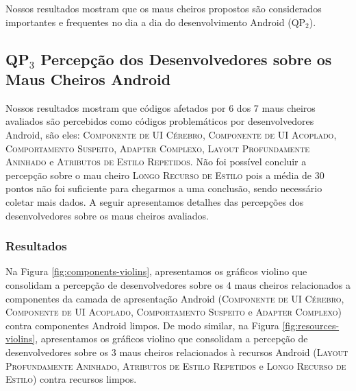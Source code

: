 \begin{square}
  \small
  Nossos resultados mostram que os maus cheiros propostos são considerados importantes e frequentes no dia a dia do desenvolvimento Android (QP$_2$). 
\end{square}




\subsection{QP$_3$ Percepção dos Desenvolvedores sobre os Maus Cheiros Android}
\label{phase3-results}

Nossos resultados mostram que códigos afetados por 6 dos 7 maus cheiros avaliados são percebidos como códigos problemáticos por desenvolvedores Android, são eles: \textsc{\small Componente de UI Cérebro}, \textsc{\small Componente de UI Acoplado}, \textsc{\small Comportamento Suspeito}, \textsc{\small Adapter Complexo}, \textsc{\small Layout Profundamente Aninhado} e \textsc{\small Atributos de Estilo Repetidos}. Não foi possível concluir a percepção sobre o mau cheiro \textsc{\small Longo Recurso de Estilo} pois a média de 30 pontos não foi suficiente para chegarmos a uma conclusão, sendo necessário coletar mais dados. A seguir apresentamos detalhes das percepções dos desenvolvedores sobre os maus cheiros avaliados.



\subsubsection{Resultados}
\label{sec:results-phase3}

Na Figura \ref{fig:components-violins}, apresentamos os gráficos violino que consolidam a percepção de desenvolvedores sobre os 4 maus cheiros relacionados a componentes da camada de apresentação Android (\textsc{\small Componente de UI Cérebro}, \textsc{\small Componente de UI Acoplado}, \textsc{\small Comportamento Suspeito} e \textsc{\small Adapter Complexo}) contra componentes Android limpos. De modo similar, na Figura \ref{fig:resources-violins}, apresentamos os gráficos violino que consolidam a percepção de desenvolvedores sobre os 3 maus cheiros relacionados à recursos Android (\textsc{\small Layout Profundamente Aninhado}, \textsc{\small Atributos de Estilo Repetidos} e \textsc{\small Longo Recurso de Estilo}) contra recursos limpos. 


